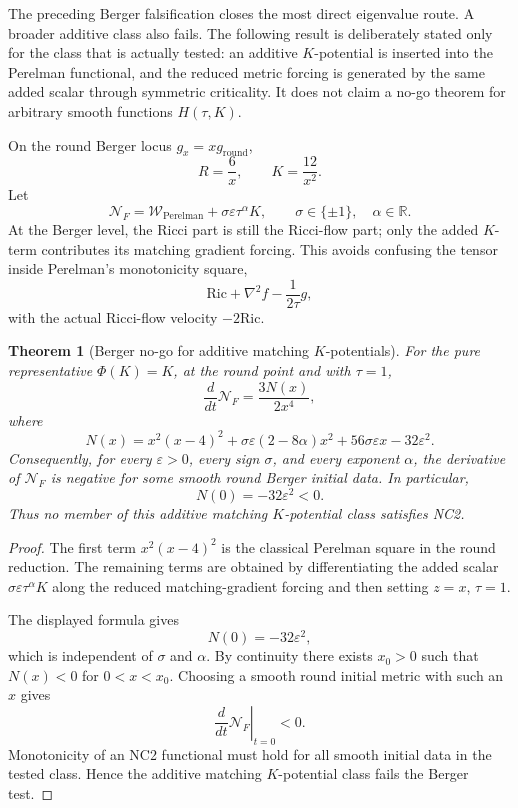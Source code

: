 \documentclass[11pt]{amsart}
\newtheorem{theorem}{Theorem}
\newcommand{\Ric}{\mathrm{Ric}}
\newcommand{\Wcal}{\mathcal W}
\newcommand{\Ncal}{\mathcal N}
\begin{document}
The preceding Berger falsification closes the most direct eigenvalue route.
A broader additive class also fails.  The following result is deliberately
stated only for the class that is actually tested: an additive \(K\)-potential
is inserted into the Perelman functional, and the reduced metric forcing is
generated by the same added scalar through symmetric criticality.  It does not
claim a no-go theorem for arbitrary smooth functions \(H(\tau,K)\).

On the round Berger locus \(g_x=xg_{\mathrm{round}}\),
\[
        R=\frac6x,\qquad K=\frac{12}{x^2}.
\]
Let
\[
        \Ncal_F
        =
        \Wcal_{\mathrm{Perelman}}
        +
        \sigma\varepsilon\tau^\alpha K,
        \qquad
        \sigma\in\{\pm1\},\quad \alpha\in\mathbb R .
\]
At the Berger level, the Ricci part is still the Ricci-flow part; only the
added \(K\)-term contributes its matching gradient forcing.  This avoids
confusing the tensor inside Perelman's monotonicity square,
\[
        \Ric+\nabla^2 f-\frac1{2\tau}g,
\]
with the actual Ricci-flow velocity \(-2\Ric\).

\begin{theorem}[Berger no-go for additive matching \(K\)-potentials]
For the pure representative \(\Phi(K)=K\), at the round point and with
\(\tau=1\),
\[
        \frac{d}{dt}\Ncal_F
        =
        \frac{3N(x)}{2x^4},
\]
where
\[
        N(x)
        =
        x^2(x-4)^2
        +
        \sigma\varepsilon(2-8\alpha)x^2
        +
        56\sigma\varepsilon x
        -
        32\varepsilon^2 .
\]
Consequently, for every \(\varepsilon>0\), every sign \(\sigma\), and every
exponent \(\alpha\), the derivative of \(\Ncal_F\) is negative for some smooth
round Berger initial data.  In particular,
\[
        N(0)=-32\varepsilon^2<0 .
\]
Thus no member of this additive matching \(K\)-potential class satisfies NC2.
\end{theorem}

\begin{proof}
The first term \(x^2(x-4)^2\) is the classical Perelman square in the round
reduction.  The remaining terms are obtained by differentiating the added
scalar \(\sigma\varepsilon\tau^\alpha K\) along the reduced matching-gradient
forcing and then setting \(z=x\), \(\tau=1\).

The displayed formula gives
\[
        N(0)=-32\varepsilon^2,
\]
which is independent of \(\sigma\) and \(\alpha\).  By continuity there exists
\(x_0>0\) such that \(N(x)<0\) for \(0<x<x_0\).  Choosing a smooth round
initial metric with such an \(x\) gives
\[
        \left.\frac{d}{dt}\Ncal_F\right|_{t=0}<0 .
\]
Monotonicity of an NC2 functional must hold for all smooth initial data in the
tested class.  Hence the additive matching \(K\)-potential class fails the
Berger test.
\end{proof}
\end{document}
